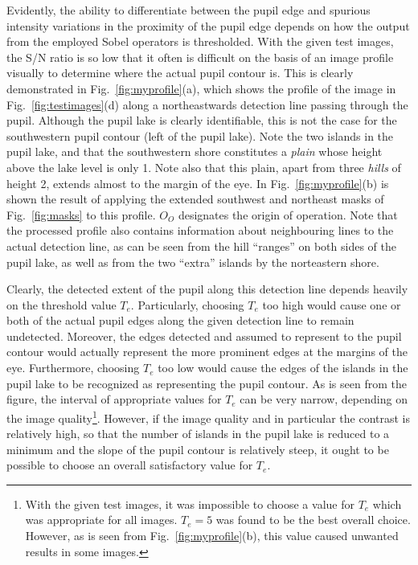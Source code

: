 Evidently, the ability to differentiate between the pupil edge and
spurious intensity variations in the proximity of the pupil edge
depends on how the output from the employed Sobel operators is
thresholded.  With the given test images, the S/N ratio is so low that
it often is difficult on the basis of an image profile visually to
determine where the actual pupil contour is.  This is clearly
demonstrated in Fig.~\ref{fig:myprofile}(a), which shows the profile
of the image in Fig.~\ref{fig:testimages}(d) along a northeastwards
detection line passing through the pupil.  Although the pupil lake is
clearly identifiable, this is not the case for the southwestern pupil
contour (left of the pupil lake).  Note the two islands in the pupil
lake, and that the southwestern shore constitutes a {\em plain\/}
whose height above the lake level is only 1.  Note also that this
plain, apart from three {\em hills\/} of height 2, extends almost to
the margin of the eye.  In Fig.~\ref{fig:myprofile}(b) is shown the
result of applying the extended southwest and northeast masks of
Fig.~\ref{fig:masks} to this profile.  $O_{O}$ designates the origin
of operation.  Note that the processed profile also contains
information about neighbouring lines to the actual detection line, as
can be seen from the hill ``ranges'' on both sides of the pupil lake,
as well as from the two ``extra'' islands by the norteastern shore.

Clearly, the detected extent of the pupil along this detection line
depends heavily on the threshold value $T_{e}$.  Particularly,
choosing $T_{e}$ too high would cause one or both of the actual pupil
edges along the given detection line to remain undetected.  Moreover,
the edges detected and assumed to represent to the pupil contour would
actually represent the more prominent edges at the margins of the eye.
Furthermore, choosing $T_{e}$ too low would cause the edges of the
islands in the pupil lake to be recognized as representing the pupil
contour.  As is seen from the figure, the interval of appropriate
values for $T_{e}$ can be very narrow, depending on the image
quality\footnote{\label{pg:TEproblems}With the given test images, it
  was impossible to choose a value for $T_{e}$ which was appropriate
  for all images.  $T_{e}=5$ was found to be the best overall choice.
  However, as is seen from Fig.~\ref{fig:myprofile}(b), this value
  caused unwanted results in some images.}.  However, if the image
quality and in particular the contrast is relatively high, so that the
number of islands in the pupil lake is reduced to a minimum and the
slope of the pupil contour is relatively steep, it ought to be
possible to choose an overall satisfactory value for $T_{e}$.

